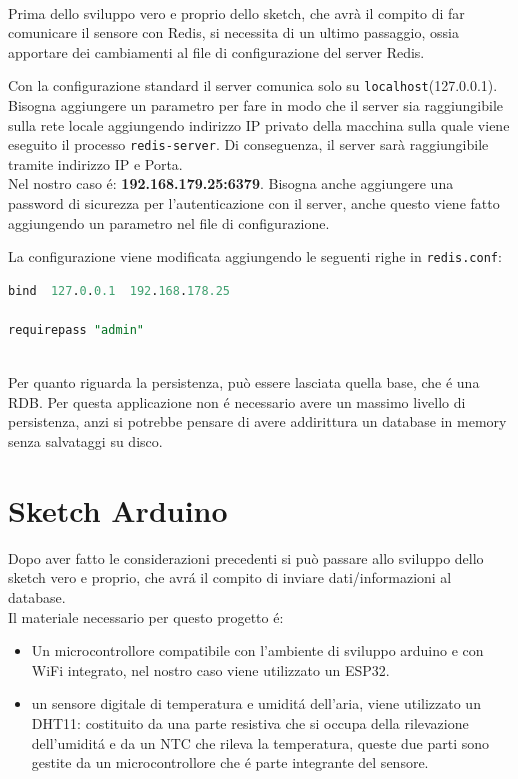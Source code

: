 \\

Prima dello sviluppo vero e proprio dello sketch, che avrà il compito di far comunicare il sensore con Redis,
si necessita di un ultimo passaggio, ossia apportare dei cambiamenti al file di configurazione del server Redis.

Con la configurazione standard il server comunica solo su \texttt{localhost}(127.0.0.1).
Bisogna aggiungere un parametro per fare in modo che il server sia raggiungibile sulla rete locale aggiungendo indirizzo IP
privato della macchina sulla quale viene eseguito il processo \texttt{redis-server}.
Di conseguenza, il server sarà raggiungibile tramite indirizzo IP e Porta.\\
Nel nostro caso é: \textbf{192.168.179.25:6379}.
Bisogna anche aggiungere una password di sicurezza per l'autenticazione con il server, anche questo viene fatto
aggiungendo un parametro nel file di configurazione.

La configurazione viene modificata aggiungendo le seguenti righe in \texttt{redis.conf}:
\begin{lstlisting}[autogobble, style=redis-cli, language=SQL]
bind  127.0.0.1  192.168.178.25

requirepass "admin"\end{lstlisting}

\\

Per quanto riguarda la persistenza, può essere lasciata quella base, che é una RDB.
Per questa applicazione non é necessario avere un massimo livello di persistenza, anzi si potrebbe pensare
di avere addirittura un database in memory senza salvataggi su disco.

\section{Sketch Arduino}
Dopo aver fatto le considerazioni precedenti si può passare allo sviluppo dello sketch vero e proprio, che avrá il compito
di inviare dati/informazioni al database.\\
Il materiale necessario per questo progetto é:
\begin{itemize}
    \item Un microcontrollore compatibile con l'ambiente di sviluppo arduino e con WiFi integrato,
          nel nostro caso viene utilizzato un ESP32.
    \item un sensore digitale di temperatura e umiditá dell'aria, viene utilizzato un DHT11: costituito da una parte resistiva
    che si occupa della rilevazione dell'umiditá e da un NTC che rileva la temperatura, queste due parti sono gestite
    da un microcontrollore che é parte integrante del sensore.
\end{itemize}

